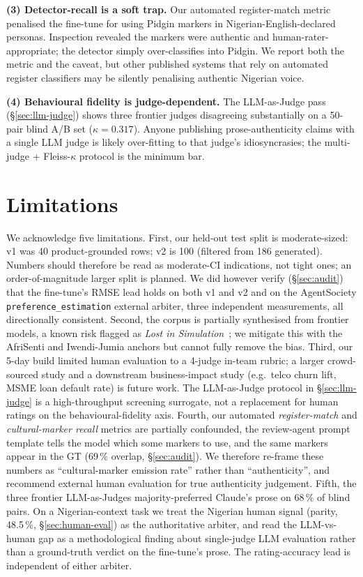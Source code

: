 \documentclass[sigconf,nonacm,balance]{acmart}
\begin{document}
\textbf{(3) Detector-recall is a soft trap.} Our automated
register-match metric penalised the fine-tune for using Pidgin markers
in Nigerian-English-declared personas. Inspection revealed the markers
were authentic and human-rater-appropriate; the detector simply
over-classifies into Pidgin. We report both the metric and the caveat,
but other published systems that rely on automated register
classifiers may be silently penalising authentic Nigerian voice.

\textbf{(4) Behavioural fidelity is judge-dependent.} The LLM-as-Judge
pass (§\ref{sec:llm-judge}) shows three frontier judges disagreeing
substantially on a 50-pair blind A/B set ($\kappa = 0.317$). Anyone
publishing prose-authenticity claims with a single LLM judge is
likely over-fitting to that judge's idiosyncrasies; the multi-judge
+ Fleiss-$\kappa$ protocol is the minimum bar.

\section{Limitations}
\label{sec:limitations}

We acknowledge five limitations. First, our held-out test split is
moderate-sized: v1 was 40 product-grounded rows; v2 is 100 (filtered
from 186 generated). Numbers should therefore be read as moderate-CI
indications, not tight ones; an order-of-magnitude larger split is
planned. We did however verify (§\ref{sec:audit}) that the fine-tune's
RMSE lead holds on both v1 and v2 and on the AgentSociety
\texttt{preference\_estimation} external arbiter, three independent
measurements, all directionally consistent.
Second, the corpus is partially synthesised from frontier models, a
known risk flagged as \emph{Lost in Simulation}~\cite{lostinsimulation};
we mitigate this with the AfriSenti and Iwendi-Jumia anchors but
cannot fully remove the bias.
Third, our 5-day build limited human evaluation to a 4-judge in-team
rubric; a larger crowd-sourced study and a downstream business-impact
study (e.g.\ telco churn lift, MSME loan default rate) is future work.
The LLM-as-Judge protocol in §\ref{sec:llm-judge} is a
high-throughput screening surrogate, not a replacement for human
ratings on the behavioural-fidelity axis.
Fourth, our automated \emph{register-match} and \emph{cultural-marker
recall} metrics are partially confounded, the review-agent prompt
template  tells the model which some markers to use,
and the same markers appear in the GT (69\,\% overlap,
§\ref{sec:audit}). We therefore re-frame these numbers as
``cultural-marker emission rate'' rather than ``authenticity'', and
recommend external human evaluation for true authenticity judgement.
Fifth, the three frontier LLM-as-Judges majority-preferred Claude's prose
on 68\,\% of blind pairs. On a Nigerian-context task we treat the Nigerian
human signal (parity, 48.5\,\%, \S\ref{sec:human-eval}) as the authoritative
arbiter, and read the LLM-vs-human gap as a methodological finding about
single-judge LLM evaluation rather than a ground-truth verdict on the
fine-tune's prose. The rating-accuracy lead is independent of either
arbiter.
\end{document}
